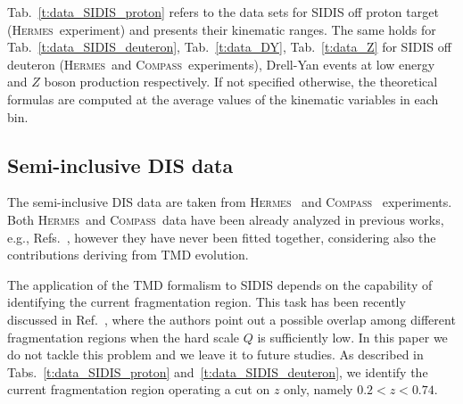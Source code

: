 \documentclass[aps,preprintnumbers,showpacs,nofootinbib,superscriptaddress,floatfix]{revtex4}
\newcommand{\hermes}{\textsc{Hermes}}
\newcommand{\compass}{\textsc{Compass}}
\begin{document}
Tab.~\ref{t:data_SIDIS_proton} refers to the data sets for SIDIS off proton target (\hermes\ experiment) and presents their kinematic ranges. 
The same holds for Tab.~\ref{t:data_SIDIS_deuteron}, Tab.~\ref{t:data_DY}, Tab.~\ref{t:data_Z} for SIDIS off deuteron (\hermes\ and \compass\ experiments), Drell-Yan events at low energy and $Z$ boson production respectively. 
If not specified otherwise, the theoretical formulas are computed at the
average values of the kinematic variables in each bin.

 
\subsection{Semi-inclusive DIS data}
\label{ss:SIDIS data}

The semi-inclusive DIS data are taken from \hermes~\cite{Airapetian:2012ki} and \compass~\cite{Adolph:2013stb} experiments. 
Both \hermes\ and \compass\ data have been already analyzed in previous works,
e.g., Refs.~\cite{Signori:2013mda,Anselmino:2013lza}, 
however they have never been
fitted together, considering also the contributions deriving from TMD
evolution. 

The application of the TMD formalism to SIDIS depends on the capability of
identifying the current fragmentation region. This task has been recently
discussed in Ref.~\cite{Boglione:2016bph}, where the authors point out a
possible overlap among different  fragmentation regions when the hard scale
$Q$ is sufficiently low.  
In this paper we do not tackle this problem and we leave it to future
studies. As described in Tabs.~\ref{t:data_SIDIS_proton}
and~\ref{t:data_SIDIS_deuteron}, we identify the current fragmentation region
operating a cut on $z$ only, namely $0.2 < z < 0.74$.
\end{document}
